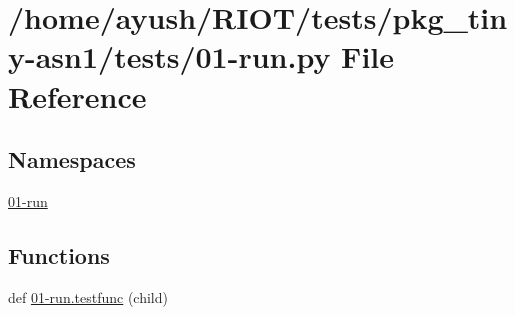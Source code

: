 \hypertarget{pkg__tiny-asn1_2tests_201-run_8py}{}\section{/home/ayush/\+R\+I\+O\+T/tests/pkg\+\_\+tiny-\/asn1/tests/01-\/run.py File Reference}
\label{pkg__tiny-asn1_2tests_201-run_8py}
\subsection*{Namespaces}
\begin{DoxyCompactItemize}
\item 
 \hyperlink{namespace01-run}{01-\/run}
\end{DoxyCompactItemize}
\subsection*{Functions}
\begin{DoxyCompactItemize}
\item 
def \hyperlink{namespace01-run_aff983ffd4ab0e6bf8e7e58970e4a10bb}{01-\/run.\+testfunc} (child)
\end{DoxyCompactItemize}

